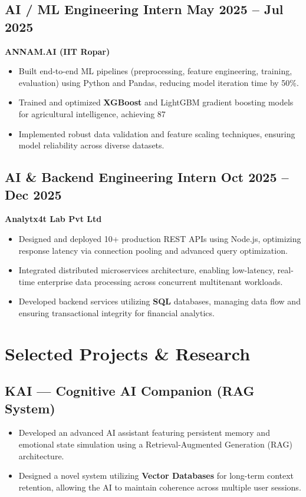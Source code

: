 \documentclass[10pt, a4paper]{article}
\begin{document}
\subsection*{AI / ML Engineering Intern \hfill May 2025 – Jul 2025}
\textbf{ANNAM.AI (IIT Ropar)}
\begin{itemize}[leftmargin=*, itemsep=1pt]
    \item Built end-to-end ML pipelines (preprocessing, feature engineering, training, evaluation) using Python and Pandas, reducing model iteration time by 50\%.
    \item Trained and optimized \textbf{XGBoost} and LightGBM gradient boosting models for agricultural intelligence, achieving 87%
    \item Implemented robust data validation and feature scaling techniques, ensuring model reliability across diverse datasets.
\end{itemize}

\subsection*{AI & Backend Engineering Intern \hfill Oct 2025 – Dec 2025}
\textbf{Analytx4t Lab Pvt Ltd}
\begin{itemize}[leftmargin=*, itemsep=1pt]
    \item Designed and deployed 10+ production REST APIs using Node.js, optimizing response latency via connection pooling and advanced query optimization.
    \item Integrated distributed microservices architecture, enabling low-latency, real-time enterprise data processing across concurrent multitenant workloads.
    \item Developed backend services utilizing \textbf{SQL} databases, managing data flow and ensuring transactional integrity for financial analytics.
\end{itemize}

\section*{Selected Projects & Research}

\subsection*{KAI — Cognitive AI Companion (RAG System)}
\begin{itemize}[leftmargin=*, itemsep=1pt]
    \item Developed an advanced AI assistant featuring persistent memory and emotional state simulation using a Retrieval-Augmented Generation (RAG) architecture.
    \item Designed a novel system utilizing \textbf{Vector Databases} for long-term context retention, allowing the AI to maintain coherence across multiple user sessions.
\end{itemize}
\end{document}
